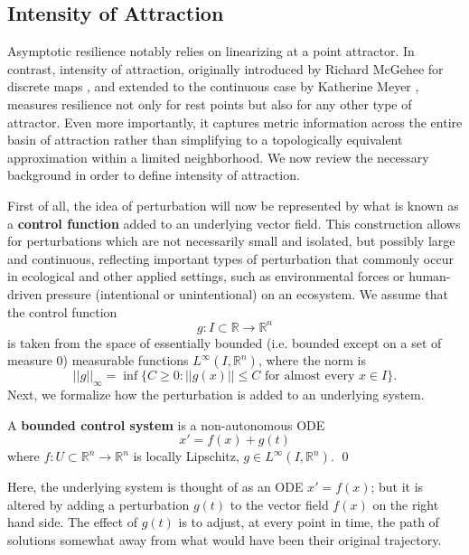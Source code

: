 \subsection{Intensity of Attraction}

Asymptotic resilience notably relies on linearizing at a point attractor. In contrast, intensity of attraction, originally introduced by Richard McGehee for discrete maps \cite{mcgeheeMetricPropertiesAttractors1988}, and extended to the continuous case by Katherine Meyer \cite{meyerMetricPropertiesAttractors2019}, measures resilience not only for rest points but also for any other type of attractor. Even more importantly, it captures metric information across the entire basin of attraction rather than simplifying to a topologically equivalent approximation within a limited neighborhood. We now review the necessary background in order to define intensity of attraction. 

First of all, the idea of perturbation will now be represented by what is known as a \textbf{control function} added to an underlying vector field. This construction allows for perturbations which are not necessarily small and isolated, but possibly large and continuous, reflecting important types of perturbation that commonly occur in ecological and other applied settings, such as environmental forces or human-driven pressure (intentional or unintentional) on an ecosystem. We assume that the control function $$g: I \subset \mathbb{R} \to \mathbb{R}^n$$ is taken from the space of essentially bounded (i.e. bounded except on a set of measure 0) measurable functions $L^\infty (I,\mathbb{R}^n)$, where the norm is 
$$||g||_\infty = \inf\{C \geq 0  :  ||g(x)|| \leq C  \text{ for almost every } x \in I \}.$$ 
Next, we formalize how the perturbation is added to an underlying system. 

\begin{definition}
	A \textbf{bounded control system} is a non-autonomous ODE 
	\begin{equation}
		\label{eqn:control_ode}x' = f(x) + g(t)
	\end{equation}
	where $f: U \subset \mathbb{R}^n \to \mathbb{R}^n$ is locally Lipschitz, $g \in L^\infty (I,\mathbb{R}^n)$. \qed
\end{definition}

Here, the underlying system is thought of as an ODE $x'=f(x)$; but it is altered by adding a perturbation $g(t)$ to the vector field $f(x)$ on the right hand side. The effect of $g(t)$ is to adjust, at every point in time, the path of solutions somewhat away from what would have been their original trajectory. 

